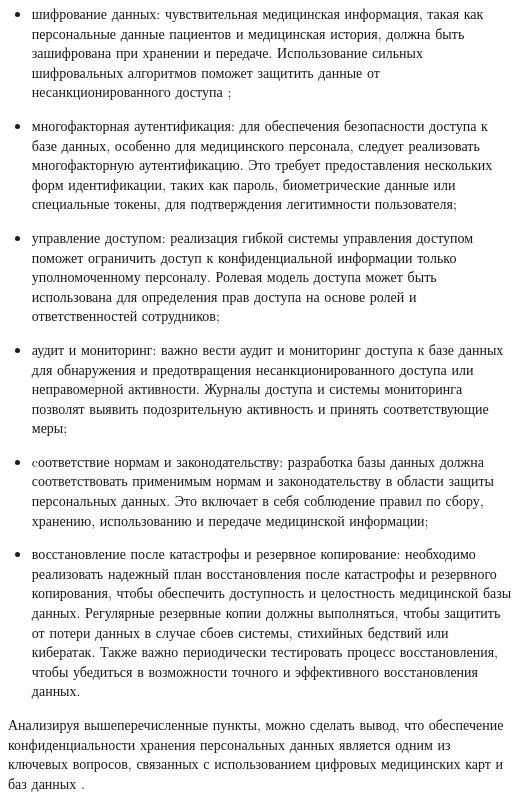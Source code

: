 \begin{itemize}
    \item шифрование данных: чувствительная медицинская информация, такая как персональные данные пациентов и медицинская история, должна быть зашифрована при хранении и передаче. Использование сильных шифровальных алгоритмов поможет защитить данные от несанкционированного доступа \cite{online11};
    \item многофакторная аутентификация: для обеспечения безопасности доступа к базе данных, особенно для медицинского персонала, следует реализовать многофакторную аутентификацию. Это требует предоставления нескольких форм идентификации, таких как пароль, биометрические данные или специальные токены, для подтверждения легитимности пользователя;
    \item управление доступом: реализация гибкой системы управления доступом поможет ограничить доступ к конфиденциальной информации только уполномоченному персоналу. Ролевая модель доступа может быть использована для определения прав доступа на основе ролей и ответственностей сотрудников;
    \item аудит и мониторинг: важно вести аудит и мониторинг доступа к базе данных для обнаружения и предотвращения несанкционированного доступа или неправомерной активности. Журналы доступа и системы мониторинга позволят выявить подозрительную активность и принять соответствующие меры;
    \item cоответствие нормам и законодательству: разработка базы данных должна соответствовать применимым нормам и законодательству в области защиты персональных данных. Это включает в себя соблюдение правил по сбору, хранению, использованию и передаче медицинской информации;
    \item восстановление после катастрофы и резервное копирование: необходимо реализовать надежный план восстановления после катастрофы и резервного копирования, чтобы обеспечить доступность и целостность медицинской базы данных. Регулярные резервные копии должны выполняться, чтобы защитить от потери данных в случае сбоев системы, стихийных бедствий или кибератак. Также важно периодически тестировать процесс восстановления, чтобы убедиться в возможности точного и эффективного восстановления данных.
\end{itemize}

Анализируя вышеперечисленные пункты, можно сделать вывод, что обеспечение конфиденциальности хранения персональных данных является одним из ключевых вопросов, связанных с использованием цифровых медицинских карт и баз данных \cite{online6}.

